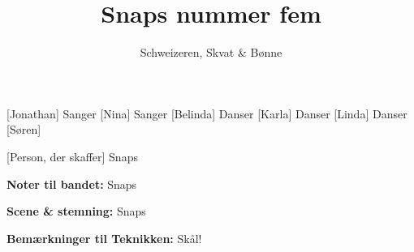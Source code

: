 \documentclass[a4paper,11pt]{article}
\title{Snaps nummer fem}
\author{Schweizeren, Skvat \& Bønne}
\begin{document}
\maketitle

\begin{roles}
    [Jonathan] Sanger
    [Nina] Sanger
    [Belinda] Danser
    [Karla] Danser
    [Linda] Danser
    [Søren]
\end{roles}

\begin{props}
    [Person, der skaffer] Snaps
\end{props}

\textbf{Noter til bandet:}
Snaps

\textbf{Scene \& stemning:}
Snaps

\textbf{Bemærkninger til Teknikken:}
Skål!
\end{document}
